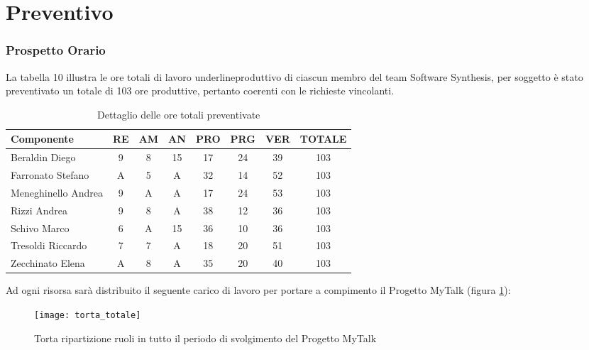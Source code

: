 \clearpage
\section{Preventivo}
\subsubsection{Prospetto Orario}
La tabella 10 illustra le ore totali di lavoro underline{produttivo} di ciascun membro del team Software Synthesis, per soggetto è stato preventivato un totale di 103 ore produttive, pertanto coerenti con le richieste vincolanti.
\begin{table}[h]
\centering
\begin{tabular}{|l|c|c|c|c|c|c|c|}
\hline
Componente& RE& AM& AN& PRO& PRG& VER& TOTALE\\
\hline
Beraldin Diego & 9& 8& 15& 17& 24& 39& 103\\
Farronato Stefano & A& 5& A& 32& 14& 52&  103\\
Meneghinello Andrea & 9& A& A& 17& 24& 53& 103\\
Rizzi Andrea & 9& 8& A& 38& 12& 36& 103\\
Schivo Marco & 6& A& 15& 36& 10& 36& 103\\
Tresoldi Riccardo & 7& 7& A& 18& 20& 51& 103\\
Zecchinato Elena & A& 8& A& 35& 20& 40& 103\\
\hline
\end{tabular}
\caption{Dettaglio delle ore totali preventivate}\label{tab:oretotali}
\end{table}

Ad ogni risorsa sarà distribuito il seguente carico di lavoro per portare a compimento il Progetto MyTalk (figura \ref{fig:oretotali}):\\
\begin{figure}[h!]
\centering
  \texttt{[image: torta\_totale]}
\caption{Torta ripartizione ruoli in tutto il periodo di svolgimento del Progetto MyTalk}\label{fig:oretotali}
\end{figure}
\clearpage
